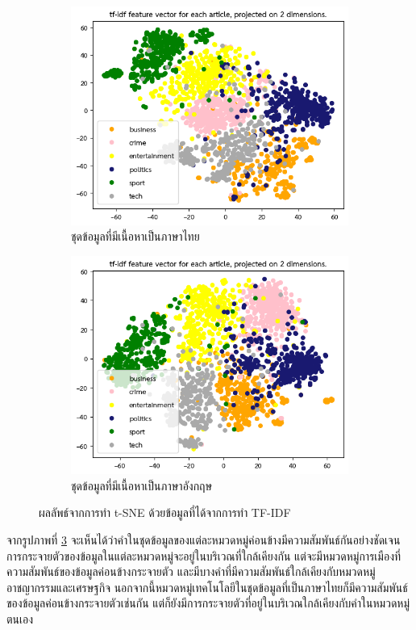 \documentclass[12pt,oneside,openright,a4paper]{cpe-thai-project}
\begin{document}
      \begin{figure}[!ht]\centering
        \begin{subfigure}{0.49\textwidth}
          \includegraphics[width=\linewidth]{./img/thai_stat/tfidf.png} 
          \caption{ชุดข้อมูลที่มีเนื้อหาเป็นภาษาไทย}
          \label{fig:tsne_thai}
        \end{subfigure}
        \begin{subfigure}{0.49\textwidth}
          \includegraphics[width=\linewidth]{./img/eng_stat/tfidf.png}
          \caption{ชุดข้อมูลที่มีเนื้อหาเป็นภาษาอังกฤษ}
          \label{fig:tsne_eng}
        \end{subfigure}
        \caption{ผลลัพธ์จากการทำ t-SNE ด้วยข้อมูลที่ได้จากการทำ TF-IDF}
        \label{fig:tsne}
      \end{figure}
      \hspace{1cm}จากรูปภาพที่ \ref{fig:tsne} จะเห็นได้ว่าคำในชุดข้อมูลของแต่ละหมวดหมู่ค่อนข้างมีความสัมพันธ์กันอย่างชัดเจน 
      การกระจายตัวของข้อมูลในแต่ละหมวดหมู่จะอยู่ในบริเวณที่ใกล้เคียงกัน แต่จะมีหมวดหมู่การเมืองที่ความสัมพันธ์ของข้อมูลค่อนข้างกระจายตัว
      และมีบางคำที่มีความสัมพันธ์ใกล้เคียงกับหมวดหมู่อาชญากรรมและเศรษฐกิจ นอกจากนี้หมวดหมู่เทคโนโลยีในชุดข้อมูลที่เป็นภาษาไทยก็มีความสัมพันธ์ของข้อมูลค่อนข้างกระจายตัวเช่นกัน
      แต่ก็ยังมีการกระจายตัวที่อยู่ในบริเวณใกล้เคียงกับคำในหมวดหมู่ตนเอง
      \newpage
    
\end{document}
